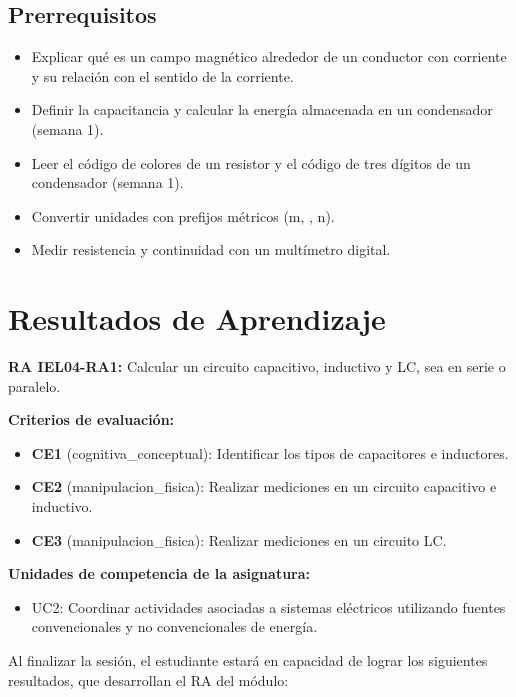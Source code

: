 \documentclass[11pt,letterpaper]{article}
\begin{document}
\subsection{Prerrequisitos}

\begin{itemize}
  \item Explicar qué es un campo magnético alrededor de un conductor con corriente y su relación con el sentido de la corriente.
  \item Definir la capacitancia y calcular la energía almacenada en un condensador (semana 1).
  \item Leer el código de colores de un resistor y el código de tres dígitos de un condensador (semana 1).
  \item Convertir unidades con prefijos métricos (m, \textmu{}, n).
  \item Medir resistencia y continuidad con un multímetro digital.
\end{itemize}

\section{Resultados de Aprendizaje}

\begin{alineacion}
\textbf{RA IEL04-RA1:} Calcular un circuito capacitivo, inductivo y LC, sea en serie o paralelo.

\textbf{Criterios de evaluación:}

\begin{itemize}
  \item \textbf{CE1} (cognitiva\_conceptual): Identificar los tipos de capacitores e inductores.
  \item \textbf{CE2} (manipulacion\_fisica): Realizar mediciones en un circuito capacitivo e inductivo.
  \item \textbf{CE3} (manipulacion\_fisica): Realizar mediciones en un circuito LC.
\end{itemize}

\textbf{Unidades de competencia de la asignatura:}

\begin{itemize}
  \item UC2: Coordinar actividades asociadas a sistemas eléctricos utilizando fuentes convencionales y no convencionales de energía.
\end{itemize}
\end{alineacion}

Al finalizar la sesión, el estudiante estará en capacidad de lograr los siguientes resultados, que desarrollan el RA del módulo:
\end{document}
